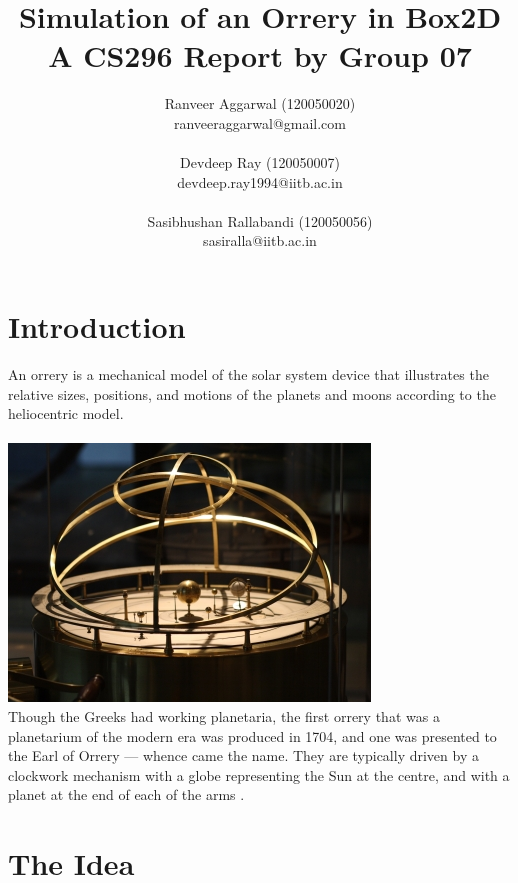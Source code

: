 \documentclass[12pt]{article}
\title{Simulation of an Orrery in Box2D\\ A CS296 Report by Group 07}
\author{Ranveer Aggarwal (120050020) \\ ranveeraggarwal@gmail.com \\ \\ Devdeep Ray (120050007) \\ devdeep.ray1994@iitb.ac.in\\ \\Sasibhushan Rallabandi (120050056) \\ sasiralla@iitb.ac.in}
\date{}
\begin{document}
\maketitle

\section{Introduction}
An orrery is a mechanical model of the solar system device that illustrates the relative sizes, positions, and motions of the planets and moons according to the heliocentric model.
\\
\\
\includegraphics[scale=0.8]{./img/orrery-main.jpg}
\\
Though the Greeks had working planetaria, the first orrery that was a planetarium of the modern era was produced in 1704, and one was presented to the Earl of Orrery — whence came the name. They are typically driven by a clockwork mechanism with a globe representing the Sun at the centre, and with a planet at the end of each of the arms \cite{wiki}.

\section{The Idea}
\end{document}

